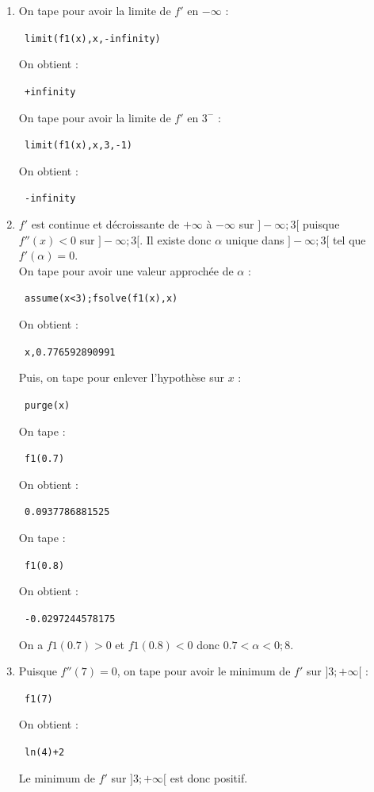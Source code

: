 \documentclass{article}
\begin{document}
\begin{giacjshere}
\begin{enumerate}
\item 
On tape pour avoir la limite de $f'$ en $-\infty$ :
\begin{center}
\verb| limit(f1(x),x,-infinity)|
\end{center}
On obtient :
\begin{center}
\verb| +infinity|
\end{center}
On tape pour avoir la limite de $f'$ en $3^-$ :
\begin{center}
\verb| limit(f1(x),x,3,-1)|
\end{center}
On obtient :
\begin{center}
\verb| -infinity|
\end{center}
\item 
$f'$ est continue et d\'ecroissante  de $+\infty$ \`a $-\infty$ sur 
$]-\infty;3[$ puisque $f''(x)<0$ sur $]-\infty;3[$. Il existe donc $\alpha$ 
unique dans $]-\infty;3[$ tel que $f'(\alpha)=0$.\\
On tape pour avoir une valeur approch\'ee de $\alpha$ :
\begin{center}
\verb| assume(x<3);fsolve(f1(x),x)|
\end{center}
On obtient :
\begin{center}
\verb| x,0.776592890991|
\end{center}
Puis, on tape pour enlever l'hypoth\`ese sur $x$ :
\begin{center}
\verb| purge(x)|
\end{center}
On tape :
\begin{center}
\verb| f1(0.7)|
\end{center}
On obtient :
\begin{center}
\verb| 0.0937786881525|
\end{center}
On tape :
\begin{center}
\verb| f1(0.8)|
\end{center}
On obtient :
\begin{center}
\verb| -0.0297244578175|
\end{center}
On a $f1(0.7)>0$ et $f1(0.8)<0$ donc $0.7<\alpha<0;8$.
\item 
Puisque $f''(7)=0$, on tape pour avoir le minimum de $f'$ sur $]3;+\infty[$ :
\begin{center}
\verb| f1(7)|
\end{center}
On obtient :
\begin{center}
\verb| ln(4)+2|
\end{center}
Le minimum de $f'$ sur $]3;+\infty[$ est donc positif.\\

\end{enumerate}
\end{giacjshere}
\end{document}
